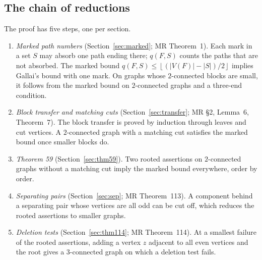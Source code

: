 \documentclass[11pt]{amsart}
\theoremstyle{definition}
\theoremstyle{remark}
\renewcommand{\_}{\oldunderscore\allowbreak}
\newcommand{\fl}[1]{\left\lfloor #1\right\rfloor}
\begin{document}
\subsection*{The chain of reductions}
The proof has five steps, one per section.
\begin{enumerate}[label=\arabic*.,leftmargin=2em]
\item \emph{Marked path numbers} (Section~\ref{sec:marked}; MR Theorem~1). Each mark in a set $S$ may
absorb one path ending there; $q(F,S)$ counts the paths that are not absorbed. The marked bound
$q(F,S)\le\fl{(|V(F)|-|S|)/2}$ implies Gallai's bound with one mark. On graphs whose $2$-connected
blocks are small, it follows from the marked bound on $2$-connected graphs and a three-end condition.
\item \emph{Block transfer and matching cuts} (Section~\ref{sec:transfer}; MR \S2, Lemma~6,
Theorem~7). The block transfer is proved by induction through leaves and cut vertices. A
$2$-connected graph with a matching cut satisfies the marked bound once smaller blocks do.
\item \emph{Theorem 59} (Section~\ref{sec:thm59}). Two rooted assertions on $2$-connected graphs
without a matching cut imply the marked bound everywhere, order by order.
\item \emph{Separating pairs} (Section~\ref{sec:sep}; MR Theorem~113). A component behind a
separating pair whose vertices are all odd can be cut off, which reduces the rooted assertions to
smaller graphs.
\item \emph{Deletion tests} (Section~\ref{sec:thm114}; MR Theorem~114). At a smallest failure of the
rooted assertions, adding a vertex $z$ adjacent to all even vertices and the root gives a
$3$-connected graph on which a deletion test fails.
\end{enumerate}
\end{document}
